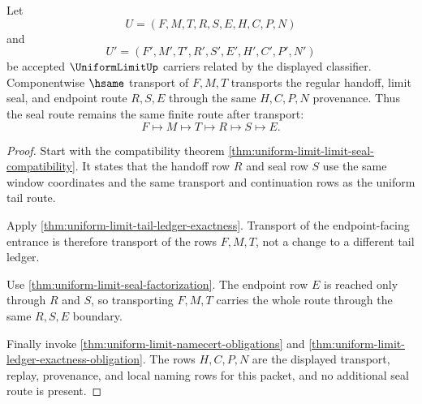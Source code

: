 \begin{theorem}
\label{thm:uniform-limit-seal-route-transport}
Let
$$
U=(F,M,T,R,S,E,H,C,P,N)
$$
and
$$
U'=(F',M',T',R',S',E',H',C',P',N')
$$
be accepted $\UniformLimitUp$ carriers related by the displayed classifier. Componentwise $\hsame$ transport of $F,M,T$ transports the regular handoff, limit seal, and endpoint route $R,S,E$ through the same $H,C,P,N$ provenance. Thus the seal route remains the same finite route after transport:
$$
F \longmapsto M \longmapsto T \longmapsto R \longmapsto S \longmapsto E.
$$
\end{theorem}
\begin{proof}
Start with the compatibility theorem \autoref{thm:uniform-limit-limit-seal-compatibility}. It states that the handoff row $R$ and seal row $S$ use the same window coordinates and the same transport and continuation rows as the uniform tail route.

Apply \autoref{thm:uniform-limit-tail-ledger-exactness}. Transport of the endpoint-facing entrance is therefore transport of the rows $F,M,T$, not a change to a different tail ledger.

Use \autoref{thm:uniform-limit-seal-factorization}. The endpoint row $E$ is reached only through $R$ and $S$, so transporting $F,M,T$ carries the whole route through the same $R,S,E$ boundary.

Finally invoke \autoref{thm:uniform-limit-namecert-obligations} and \autoref{thm:uniform-limit-ledger-exactness-obligation}. The rows $H,C,P,N$ are the displayed transport, replay, provenance, and local naming rows for this packet, and no additional seal route is present.
\end{proof}

